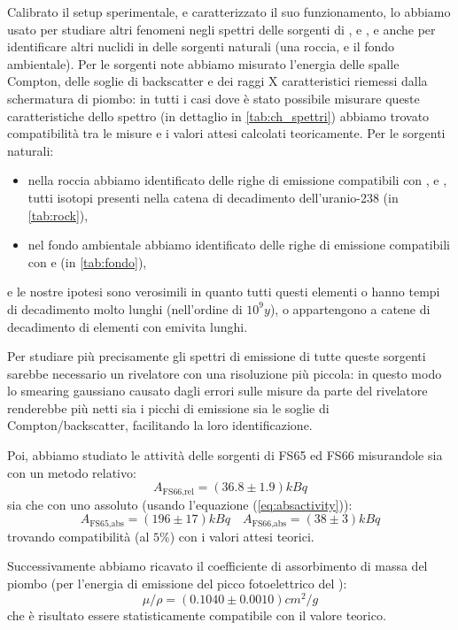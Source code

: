 Calibrato il setup sperimentale, e caratterizzato il suo funzionamento, lo abbiamo usato per studiare altri fenomeni negli spettri delle sorgenti di ,  e , e anche per identificare altri nuclidi in delle sorgenti naturali (una roccia, e il fondo ambientale).
Per le sorgenti note abbiamo misurato l'energia delle spalle Compton, delle soglie di backscatter e dei raggi X caratteristici riemessi dalla schermatura di piombo: in tutti i casi dove è stato possibile misurare queste caratteristiche dello spettro (in dettaglio in \cref{tab:ch_spettri}) abbiamo trovato compatibilità tra le misure e i valori attesi calcolati teoricamente.
Per le sorgenti naturali:
\begin{itemize}
	\item nella roccia abbiamo identificato delle righe di emissione compatibili con ,  e , tutti isotopi presenti nella catena di decadimento dell'uranio-238 (in \cref{tab:rock}),
	\item nel fondo ambientale abbiamo identificato delle righe di emissione compatibili con  e  (in \cref{tab:fondo}),
\end{itemize}
e le nostre ipotesi sono verosimili in quanto tutti questi elementi o hanno tempi di decadimento molto lunghi (nell'ordine di $ 10^{9} \unit{y} $), o appartengono a catene di decadimento di elementi con emivita lunghi.

Per studiare più precisamente gli spettri di emissione di tutte queste sorgenti sarebbe necessario un rivelatore con una risoluzione più piccola: in questo modo lo smearing gaussiano causato dagli errori sulle misure da parte del rivelatore renderebbe più netti sia i picchi di emissione sia le soglie di Compton/backscatter, facilitando la loro identificazione.

Poi, abbiamo studiato le attività delle sorgenti di  FS65 ed FS66 misurandole sia con un metodo relativo:
\begin{equation}
A_\text{FS66,rel} = (36.8 \pm 1.9) \unit{kBq}
\end{equation}	
sia che con uno assoluto (usando l'equazione (\ref{eq:absactivity})):
\begin{equation}
A_\text{FS65,abs} = (196 \pm 17) \unit{kBq} \quad A_\text{FS66,abs} = (38 \pm 3) \unit {kBq}
\end{equation}
trovando compatibilità (al $ 5\% $) con i valori attesi teorici.

Successivamente abbiamo ricavato il coefficiente di assorbimento di massa del piombo (per l'energia di emissione del picco fotoelettrico del ): 
\begin{equation}
\mu /\rho = (0.1040 \pm 0.0010) \unit{cm^2/g} 
\end{equation}
che è risultato essere statisticamente compatibile con il valore teorico.

